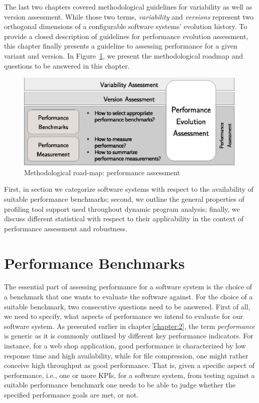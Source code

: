 The last two chapters covered methodological guidelines for variability as well
as version assessment. While those two terms, \emph{variability} and
\emph{versions} represent two orthogonal dimensions of a configurable software
systems’ evolution history. To provide a closed description of guidelines for performance
evolution assessment, this chapter finally presents a guideline to assessing
performance for a given variant and version. In Figure~\ref{fig:roadmap_3}, we
present the methodological roadmap and questions to be answered in this chapter.

\begin{figure}[h!]
	\centering
	\includegraphics[width=0.99\textwidth]{images/process_perfassessment.eps}
	\caption{Methodological road-map: performance assessment}
	\label{fig:roadmap_3}
\end{figure}

First, in section we categorize software systems with respect to the availability of suitable performance
benchmarks; second, we outline the general properties of profiling tool support
used throughout dynamic program analysis; finally, we discuss different statistical
with respect to their applicability in the context of performance assessment
and robustness.

\section{Performance Benchmarks}
The essential part of assessing performance for a software system is the choice
of a benchmark that one wants to evaluate the software against. For the choice
of a suitable benchmark, two consecutive questions need to be answered. First of
all, we need to specify, what aspects of performance we intend to evaluate for
our software system. As presented earlier in chapter\,\ref{chapter:2}, the term
\emph{performance} is generic as it is commonly outlined by different key
performance indicators. For instance, for a web shop application, good performance is characterized by low response
time and high availability, while for file compression, one might rather
conceive high throughput as good performance. That is, given a specific
aspect of performance, i.e., one or more KPIs, for a software system, from
testing against a suitable performance benchmark one needs to be able to judge
whether the specified performance goals are met, or not.

